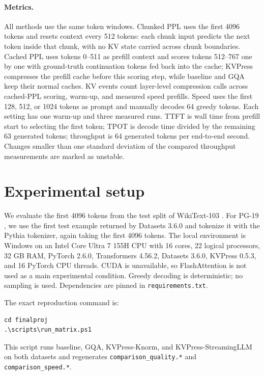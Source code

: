 \documentclass{article}
\begin{document}
\paragraph{Metrics.}
All methods use the same token windows. Chunked PPL uses the first 4096 tokens and resets context every 512 tokens: each chunk input predicts the next token inside that chunk, with no KV state carried across chunk boundaries. Cached PPL uses tokens 0--511 as prefill context and scores tokens 512--767 one by one with ground-truth continuation tokens fed back into the cache; KVPress compresses the prefill cache before this scoring step, while baseline and GQA keep their normal caches. KV events count layer-level compression calls across cached-PPL scoring, warm-up, and measured speed prefills. Speed uses the first 128, 512, or 1024 tokens as prompt and manually decodes 64 greedy tokens. Each setting has one warm-up and three measured runs. TTFT is wall time from prefill start to selecting the first token; TPOT is decode time divided by the remaining 63 generated tokens; throughput is 64 generated tokens per end-to-end second. Changes smaller than one standard deviation of the compared throughput measurements are marked as unstable.

\section{Experimental setup}

We evaluate the first 4096 tokens from the test split of WikiText-103 \citep{merity2016wikitext}. For PG-19 \citep{rae2020compressive}, we use the first test example returned by Datasets 3.6.0 and tokenize it with the Pythia tokenizer, again taking the first 4096 tokens. The local environment is Windows on an Intel Core Ultra 7 155H CPU with 16 cores, 22 logical processors, 32 GB RAM, PyTorch 2.6.0, Transformers 4.56.2, Datasets 3.6.0, KVPress 0.5.3, and 16 PyTorch CPU threads. CUDA is unavailable, so FlashAttention is not used as a main experimental condition. Greedy decoding is deterministic; no sampling is used. Dependencies are pinned in \texttt{requirements.txt}.

The exact reproduction command is:
\begin{verbatim}
cd finalproj
.\scripts\run_matrix.ps1
\end{verbatim}
This script runs baseline, GQA, KVPress-Knorm, and KVPress-StreamingLLM on both datasets and regenerates \texttt{comparison\_quality.*} and \texttt{comparison\_speed.*}.
\end{document}
